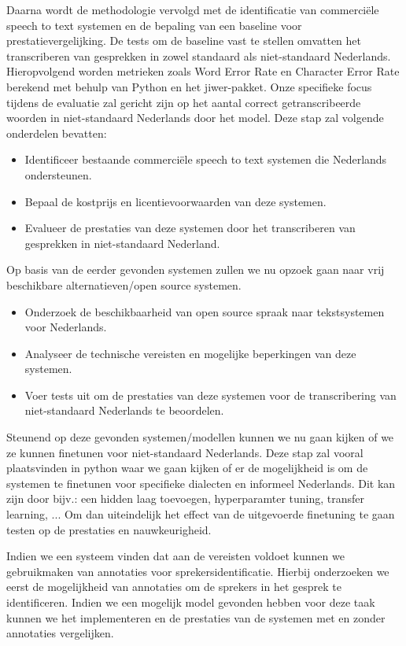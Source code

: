 \par Daarna wordt de methodologie vervolgd met de identificatie van commerciële speech to text systemen en de bepaling van een baseline voor prestatievergelijking. De tests om de baseline vast te stellen omvatten het transcriberen van gesprekken in zowel standaard als niet-standaard Nederlands. Hieropvolgend worden metrieken zoals Word Error Rate en Character Error Rate berekend met behulp van Python en het jiwer-pakket. Onze specifieke focus tijdens de evaluatie zal gericht zijn op het aantal correct getranscribeerde woorden in niet-standaard Nederlands door het model.
Deze stap zal volgende onderdelen bevatten:
\begin{itemize}
    \item Identificeer bestaande commerciële speech to text systemen die Nederlands ondersteunen.
    \item Bepaal de kostprijs en licentievoorwaarden van deze systemen.
    \item Evalueer de prestaties van deze systemen door het transcriberen van gesprekken in niet-standaard Nederland.
\end{itemize}   
\par Op basis van de eerder gevonden systemen zullen we nu opzoek gaan naar vrij beschikbare alternatieven/open source systemen.
\begin{itemize}
    \item Onderzoek de beschikbaarheid van open source spraak naar tekstsystemen voor Nederlands.
    \item Analyseer de technische vereisten en mogelijke beperkingen van deze systemen.
    \item Voer tests uit om de prestaties van deze systemen voor de transcribering van niet-standaard Nederlands te beoordelen.
\end{itemize}
\par Steunend op deze gevonden systemen/modellen kunnen we nu gaan kijken of we ze kunnen finetunen voor niet-standaard Nederlands. Deze stap zal vooral plaatsvinden in python waar we gaan kijken of er de mogelijkheid is om de systemen te finetunen voor specifieke dialecten en informeel Nederlands. Dit kan zijn door bijv.: een hidden laag toevoegen, hyperparamter tuning, transfer learning, ... Om dan uiteindelijk het effect van de uitgevoerde finetuning te gaan testen op de prestaties en nauwkeurigheid.

\par Indien we een systeem vinden dat aan de vereisten voldoet kunnen we gebruikmaken van annotaties voor sprekersidentificatie. Hierbij onderzoeken we eerst de mogelijkheid van annotaties om de sprekers in het gesprek te identificeren. Indien we een mogelijk model gevonden hebben voor deze taak kunnen we het implementeren en de prestaties van de systemen met en zonder annotaties vergelijken.

